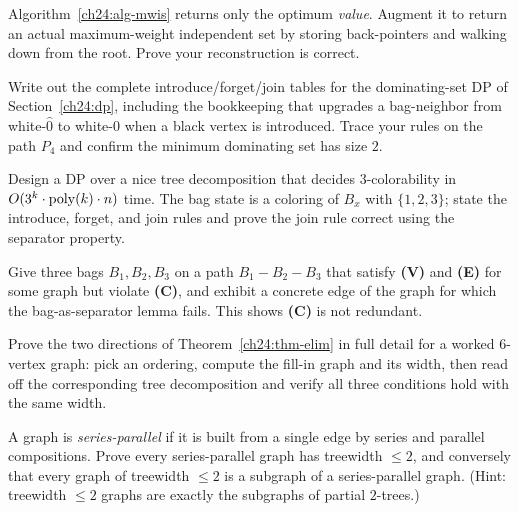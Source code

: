 \begin{exercise}
Algorithm~\ref{ch24:alg-mwis} returns only the optimum \emph{value}. Augment it to
return an actual maximum-weight independent set by storing back-pointers and
walking down from the root. Prove your reconstruction is correct.
\end{exercise}

\begin{exercise}
Write out the complete introduce/forget/join tables for the dominating-set DP of
Section~\ref{ch24:dp}, including the bookkeeping that upgrades a bag-neighbor from
white-$\hat0$ to white-$0$ when a black vertex is introduced. Trace your rules on
the path $P_4$ and confirm the minimum dominating set has size $2$.
\end{exercise}

\begin{exercise}
Design a DP over a nice tree decomposition that decides $3$-colorability in
$O(3^k\cdot\operatorname{poly}(k)\cdot n)$ time. The bag state is a coloring of $B_x$ with
$\{1,2,3\}$; state the introduce, forget, and join rules and prove the join rule
correct using the separator property.
\end{exercise}

\begin{exercise}
Give three bags $B_1,B_2,B_3$ on a path $B_1-B_2-B_3$ that satisfy \textbf{(V)} and
\textbf{(E)} for some graph but violate \textbf{(C)}, and exhibit a concrete edge
of the graph for which the bag-as-separator lemma fails. This shows \textbf{(C)} is
not redundant.
\end{exercise}

\begin{exercise}[Elimination $=$ fill-in]
Prove the two directions of Theorem~\ref{ch24:thm-elim} in full detail for a
worked $6$-vertex graph: pick an ordering, compute the fill-in graph and its
width, then read off the corresponding tree decomposition and verify all three
conditions hold with the same width.
\end{exercise}

\begin{exercise}
A graph is \emph{series-parallel} if it is built from a single edge by series and
parallel compositions. Prove every series-parallel graph has treewidth $\le 2$,
and conversely that every graph of treewidth $\le 2$ is a subgraph of a
series-parallel graph. (Hint: treewidth $\le 2$ graphs are exactly the subgraphs
of partial $2$-trees.)
\end{exercise}


